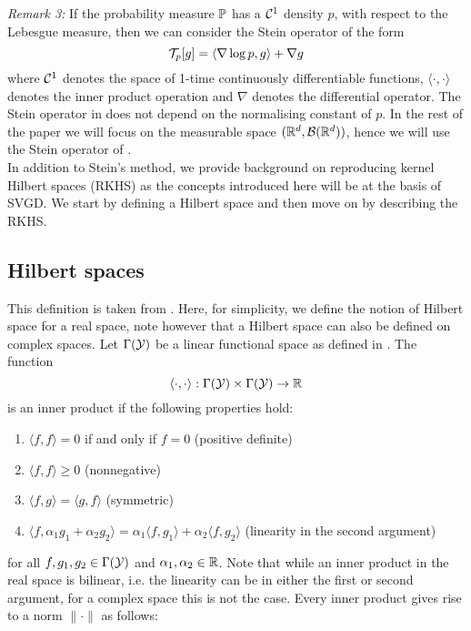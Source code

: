 \emph{Remark 3:} If the probability measure $\mathbb{P}$ has a $\mathcal{C}^1$ density $p$, with respect to the Lebesgue measure, then we can consider the Stein operator of the form 
\begin{equation}\label{score_function}
\mathcal{T}_{p}[g] = \langle \nabla \log p, g \rangle + \nabla g
\end{equation}
where $\mathcal{C}^1$ denotes the space of 1-time continuously differentiable functions, $\langle \cdot, \cdot \rangle$ denotes the inner product operation and $\nabla$ denotes the differential operator. The Stein operator in  does not depend on the normalising constant of $p$. In the rest of the paper we will focus on the measurable space $(\mathbb{R}^d, \mathcal{B}(\mathbb{R}^d))$, hence we will use the Stein operator of .
\\

\noindent In addition to Stein's method, we provide background on reproducing kernel Hilbert spaces (RKHS) as the concepts introduced here will be at the basis of SVGD. We start by defining a Hilbert space and then move on by describing the RKHS.

\subsection{Hilbert spaces}
This definition is taken from \cite{hunter2001applied}. Here, for simplicity, we define the notion of Hilbert space for a real space, note however that a Hilbert space can also be defined on complex spaces. Let $\Gamma(\mathcal{Y})$ be a linear functional space as defined in . The function 
\begin{equation*}
\langle \cdot, \cdot \rangle: \Gamma(\mathcal{Y}) \times \Gamma(\mathcal{Y}) \rightarrow \mathbb{R}
\end{equation*}
is an inner product if the following properties hold:
\begin{enumerate}
	\item $\langle f, f \rangle = 0$ if and only if $f=0$ (positive definite)
	\item $\langle f, f \rangle \geq 0$ (nonnegative)
	\item $\langle f, g \rangle = \langle  g, f \rangle$ (symmetric)
	\item $\langle f, \alpha_1 g_1 + \alpha_2 g_2 \rangle = \alpha_1 \langle f, g_1 \rangle + \alpha_2 \langle f, g_2 \rangle$ (linearity in the second argument)
\end{enumerate}
for all $f,g_1,g_2 \in \Gamma(\mathcal{Y})$ and $\alpha_1, \alpha_2 \in \mathbb{R}$. Note that while an inner product in the real space is bilinear, i.e. the linearity can be in either the first or second argument, for a complex space this is not the case. Every inner product gives rise to a norm $\parallel \cdot \parallel$ as follows:

